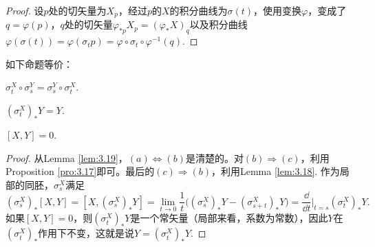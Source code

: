 \begin{proof}
设$p$处的切矢量为$X_p$，经过$p$的$X$的积分曲线为$\sigma(t)$，使用变换$\varphi$，变成了$q=\varphi(p)$，$q$处的切矢量$\varphi_{*p}X_p=(\varphi_*X)_q$以及积分曲线$\varphi(\sigma(t))=\varphi(\sigma_t p)=\varphi\circ\sigma_t\circ \varphi^{-1}(q)$.
\end{proof}

\begin{pro}如下命题等价：
\begin{compactenum}[~~~\rm ($a$)]
\item $\sigma_t^X\circ \sigma_s^Y=\sigma_s^Y\circ \sigma_t^X$.
\item $(\sigma_t^X)_*Y=Y$.
\item $[X,Y]=0$.
\end{compactenum}
\end{pro}

\begin{proof}
从Lemma \ref{lem:3.19}，$(a)\Leftrightarrow (b)$是清楚的。对$(b)\Rightarrow (c)$，利用Proposition \ref{pro:3.17}即可。最后的$(c)\Rightarrow (b)$，利用Lemma \ref{lem:3.18}. 作为局部的同胚，$\sigma_s^X$满足
\[
	(\sigma_s^X)_*[X,Y]=[X,(\sigma_s^X)_*Y]=\lim_{t\to 0}\frac{1}{t}\bigl((\sigma_s^X)_*Y-(\sigma_{s+t}^X)_*Y\bigr)=\frac{\dd}{\dd t}\biggr|_{t=s}(\sigma_t^X)_*Y.
\]
如果$[X,Y]=0$，则$(\sigma_t^X)_*Y$是一个常矢量（局部来看，系数为常数），因此$Y$在$(\sigma_t^X)_*$作用下不变，这就是说$Y=(\sigma_t^X)_*Y$.
\end{proof}




